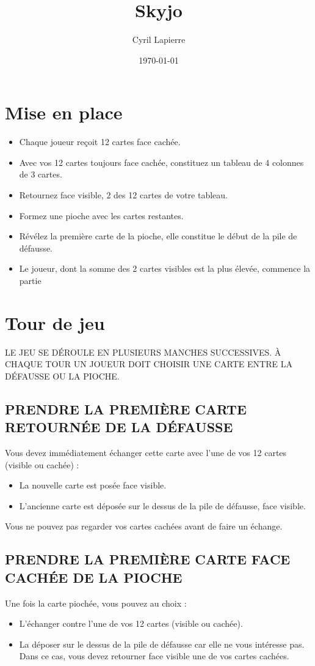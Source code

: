 \documentclass{article}%
\title{Skyjo}%
\author{Cyril Lapierre}%
\date{\today}%
\begin{document}
%
\normalsize%
\maketitle\thispagestyle{header}%
\pagestyle{header}%
\section{ Mise en place
}%
\label{sec:Miseenplace}%
\begin{itemize}%
\item%
%
 Chaque joueur reçoit 12 cartes face cachée.
%
\item%
%
 Avec vos 12 cartes toujours face cachée, constituez un tableau de 4 colonnes de 3 cartes.
%
\item%
%
 Retournez face visible, 2 des 12 cartes de votre tableau.
%
\item%
%
 Formez une pioche avec les cartes restantes.
%
\item%
%
 Révélez la première carte de la pioche, elle constitue le début de la pile de défausse.
%
\item%
%
 Le joueur, dont la somme des 2 cartes visibles est la plus élevée, commence la partie
%
\end{itemize}

%
\section{ Tour de jeu
}%
\label{sec:Tourdejeu}%
LE JEU SE DÉROULE EN PLUSIEURS MANCHES SUCCESSIVES. À CHAQUE TOUR UN JOUEUR DOIT CHOISIR UNE CARTE ENTRE LA DÉFAUSSE OU LA PIOCHE.


%
\subsection{ PRENDRE LA PREMIÈRE CARTE RETOURNÉE DE LA DÉFAUSSE
}%
\label{subsec:PRENDRELAPREMIRECARTERETOURNEDELADFAUSSE}%
Vous devez immédiatement échanger cette carte avec l’une de vos 12 cartes (visible ou cachée) :
%
\begin{itemize}%
\item%
%
 La nouvelle carte est posée face visible.
%
\item%
%
 L'ancienne carte est déposée sur le dessus de la pile de défausse, face visible.
%
\end{itemize}%
Vous ne pouvez pas regarder vos cartes cachées avant de faire un échange.


%
\subsection{ PRENDRE LA PREMIÈRE CARTE FACE CACHÉE DE LA PIOCHE
}%
\label{subsec:PRENDRELAPREMIRECARTEFACECACHEDELAPIOCHE}%
Une fois la carte piochée, vous pouvez au choix :
%
\begin{itemize}%
\item%
%
 L'échanger contre l'une de vos 12 cartes (visible ou cachée).
%
\item%
%
 La déposer sur le dessus de la pile de défausse car elle ne vous intéresse pas. Dans ce cas, vous devez retourner face visible une de vos cartes cachées.
%
\end{itemize}
\end{document}
